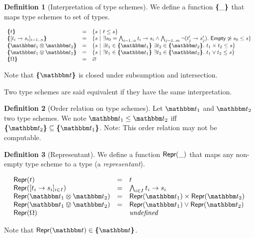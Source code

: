 \documentclass[a4paper]{article}
\theoremstyle{definition}
\newtheorem{definition}{Definition}
\begin{document}
    \begin{definition}[Interpretation of type schemes]
      We define a function $\textbf{\textup{\{}}\_\textbf{\textup{\}}}$ that maps type schemes to set of types.

      \begin{align*}
        \begin{array}{lcl}
        \tsint t &=& \{s\alt t \leq s\}\\
        \tsint {\tsfunone {t_i} {s_i}_{i=1..n}} &=& \{s\alt
        \exists s_0 = \bigwedge_{i=1..n} \arrow {t_i} {s_i}
        \land \bigwedge_{j=1..m} \neg (\arrow {t_j'} {s_j'}).\ 
        \Empty \not\simeq s_0 \leq s \}\\
        \tsint {\ts_1 \tstimes \ts_2} &=& \{s\alt \exists t_1 \in \tsint {\ts_1}\ 
        \exists t_2 \in \tsint {\ts_2}.\ \pair {t_1} {t_2} \leq s\}\\
        \tsint {\ts_1 \tsor \ts_2} &=& \{s\alt \exists t_1 \in \tsint {\ts_1}\ 
        \exists t_2 \in \tsint {\ts_2}.\ {t_1} \vee {t_2} \leq s\}\\
        \tsint \tsempty &=& \varnothing
        \end{array}
      \end{align*}

    Note that $\tsint \ts$ is closed under subsumption and intersection.
    
    Two type schemes are said equivalent if they have the same interpretation.
    \end{definition}
 
    \begin{definition}[Order relation on type schemes]
      Let $\ts_1$ and $\ts_2$ two type schemes.
      We note $\ts_1\leq\ts_2$ iff $\tsint {\ts_2} \subseteq \tsint {\ts_1}$.
      Note: This order relation may not be computable.
    \end{definition}

    \begin{definition}[Representant]
      We define a function $\textsf{Repr}(\_)$ that maps any non-empty type scheme to a type (a \textit{representant}).

      \begin{align*}
        \begin{array}{lcl}
        \tsrep t &=& t\\
        \tsrep {\tsfunone {t_i} {s_i}_{i\in I}} &=& \bigwedge_{i\in I} \arrow {t_i} {s_i}\\
        \tsrep {\ts_1 \tstimes \ts_2} &=& \pair {\tsrep {\ts_1}} {\tsrep {\ts_2}}\\
        \tsrep {\ts_1 \tsor \ts_2} &=& \tsrep {\ts_1} \vee \tsrep {\ts_2}\\
        \tsrep \tsempty && \textit{undefined}
        \end{array}
      \end{align*}

    Note that $\tsrep \ts \in \tsint \ts$.
    \end{definition}
\end{document}
